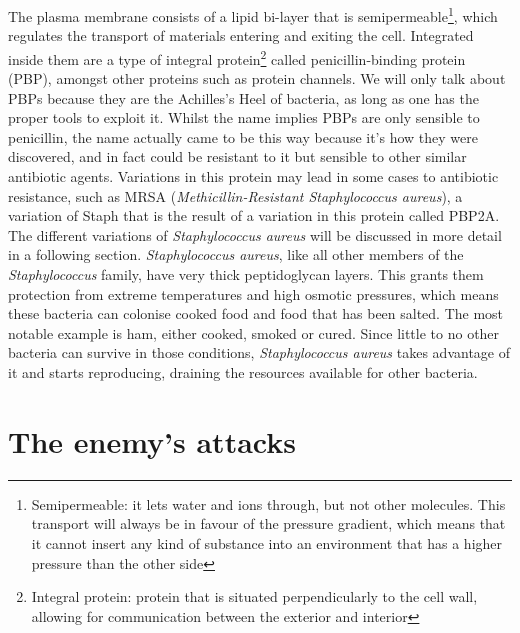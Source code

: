 The plasma membrane consists of a lipid bi-layer that is semipermeable\footnote{Semipermeable: it lets water and ions through, but not other molecules. This transport will always be in favour of the pressure gradient, which means that it cannot insert any kind of substance into an environment that has a higher pressure than the other side}, which regulates the transport of materials entering and exiting the cell. Integrated inside them are a type of integral protein\footnote{Integral protein: protein that is situated perpendicularly to the cell wall, allowing for communication between the exterior and interior} called penicillin-binding protein (PBP), amongst other  proteins such as protein channels. We will only talk about PBPs because they are the Achilles's Heel of bacteria, as long as one has the proper tools to exploit it. Whilst the name implies PBPs are only sensible to penicillin, the name actually came to be this way because it's how they were discovered, and in fact could be resistant to it but sensible to other similar antibiotic agents. Variations in this protein may lead in some cases to antibiotic resistance, such as MRSA (\emph{Methicillin-Resistant \emph{Staphylococcus aureus}}), a variation of Staph that is the result of a variation in this protein called PBP2A. The different variations of \emph{Staphylococcus aureus} will be discussed in more detail in a following section. \newline
\emph{Staphylococcus aureus}, like all other members of the \emph{Staphylococcus} family, have very thick peptidoglycan layers. This grants them protection from extreme temperatures and high osmotic pressures, which means these bacteria can colonise cooked food and food that has been salted. The most notable example is ham, either cooked, smoked or cured. Since little to no other bacteria can survive in those conditions, \emph{Staphylococcus aureus} takes advantage of it and starts reproducing, draining the resources available for other bacteria.
\section{The enemy's attacks}
